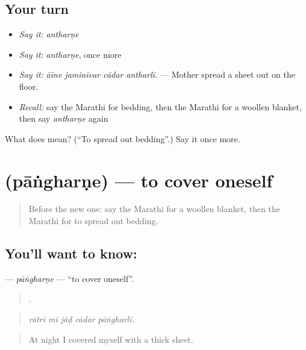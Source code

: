 \subsection*{Your turn}
\begin{itemize}
\raggedright
  \item \emph{Say it:} \emph{antharṇe}
  \item \emph{Say it:} \emph{antharṇe}, once more
  \item \emph{Say it:} \emph{āīne jaminīvar cādar antharlī.} — Mother spread a sheet out on the floor.
  \item \emph{Recall:} say the Marathi for bedding, then the Marathi for a woollen blanket, then say \emph{antharṇe} again
\end{itemize}

\begin{tcolorbox}[breakable,colback=teal!4,colframe=teal!35!black,title={Before you move on}]
What does  mean? (\textquotedblleft{}To spread out bedding\textquotedblright{}.) Say it once more.
\end{tcolorbox}
\section[\texorpdfstring{\mr{पांघरणे} (pāṅgharṇe)}{पांघरणे (pāṅgharṇe)}]{ (pāṅgharṇe) — to cover oneself}

\label{lesson:MR-C415-pangharne}



\begin{quote}
Before the new one: say the Marathi for a woollen blanket, then the Marathi for to spread out bedding.
\end{quote}

\subsection*{You'll want to know: }
\textbf{} — \emph{pāṅgharṇe} — \textquotedblleft{}to cover oneself\textquotedblright{}.

\begin{quote}
    .
\end{quote}

\begin{quote}
\emph{rātrī mī jāḍ cādar pāṅgharlī.}
\end{quote}

\begin{quote}
At night I covered myself with a thick sheet.
\end{quote}

